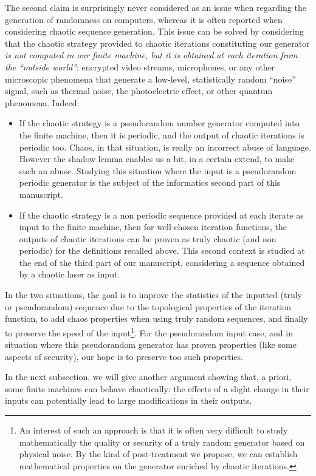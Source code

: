 The second claim is surprisingly never considered as an issue when
regarding the generation of randomness on computers, whereas it is often
reported when considering chaotic sequence generation.
This issue can be solved by considering that the chaotic strategy provided
to chaotic iterations constituting our generator \emph{is not computed in
our finite machine, but it is obtained at each iteration from the ``outside
world''}: encrypted video streams, microphones, or any other microscopic 
phenomena that generate a low-level, statistically random 
``noise'' signal, such as thermal noise, the photoelectric effect, or other quantum phenomena.
Indeed:
\begin{itemize}
\item If the chaotic strategy is a pseudorandom number generator computed into the finite machine, then it is periodic, and the output
of chaotic iterations is periodic too. Chaos, in that situation, is really an incorrect abuse
of language. However the shadow lemma enables us a bit, in a certain extend, to make such an abuse.
Studying this situation where the input is a pseudorandom periodic generator is 
the subject of the informatics second part of this manuscript.
\item If the chaotic strategy is a non periodic sequence provided at each iterate as 
input to the finite machine, then for well-chosen iteration functions, the outputs 
of chaotic iterations can be proven as truly chaotic (and non periodic) for the 
definitions recalled above. This second context is studied at the end of the
third part of our manuscript, considering a sequence obtained by a chaotic laser
as input.
\end{itemize}
In the two situations, the goal is to improve the statistics of the inputted 
(truly or pseudorandom) sequence due to the topological properties of the iteration 
function, to add chaos properties when using truly random sequences, and finally
to preserve the speed of the input\footnote{An interest of such an approach is 
that it is often very difficult to study mathematically the quality or security
of a truly random generator based on physical noise. By the kind of post-treatment
we propose, we can establish mathematical properties on the generator enriched
by chaotic iterations.}. For the pseudorandom input case, and in situation
where this pseudorandom generator has proven properties (like some aspects of
security), our hope is to preserve too such properties.

In the next subsection, we will give another argument showing that, a priori,
some finite machines can behave chaotically: the effects of a slight change in
their inputs can potentially lead to large modifications in their outputs.
 
